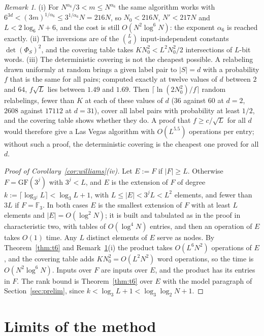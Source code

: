 \documentclass[11pt]{article}
\theoremstyle{definition}
\theoremstyle{remark}
\newtheorem{remark}[theorem]{Remark}
\newcommand{\F}{\mathbb{F}}
\newcommand{\GF}{\mathrm{GF}}
\newcommand{\Nz}{N_0}
\begin{document}
\begin{remark}\label{rem:constants6}
(i) For $N^{\alpha_6}/3<m\le N^{\alpha_6}$ the same algorithm works with $6^{3d}<(3m)^{1/\alpha_6}\le3^{1/\alpha_6}N=216N$, so $\Nz<216N$, $N'<217N$ and $L<2\log_6N+6$, and the cost is still $O(N^2\log^6N)$: the exponent $\alpha_6$ is reached exactly. (ii) The inversions are of the $\binom Ld$ input-independent constants $\det(\Phi_S)^2$, and the covering table takes $K\Nz^2<L^2\Nz^2/2$ intersections of $L$-bit words. (iii) The deterministic covering is not the cheapest possible. A relabeling drawn uniformly at random brings a given label pair to $|S|=d$ with a probability $f$ that is the same for all pairs; computed exactly at twelve values of $d$ between $2$ and $64$, $f\sqrt L$ lies between $1.49$ and $1.69$. Then $\lceil\ln(2\Nz^2)/f\rceil$ random relabelings, fewer than $K$ at each of these values of $d$ ($36$ against $60$ at $d=2$, $2608$ against $17112$ at $d=31$), cover all label pairs with probability at least $1/2$, and the covering table shows whether they do. A proof that $f\ge c/\sqrt L$ for all $d$ would therefore give a Las Vegas algorithm with $O(L^{5.5})$ operations per entry; without such a proof, the deterministic covering is the cheapest one proved for all $d$.
\end{remark}

\begin{proof}[Proof of Corollary~\ref{cor:williams}(iv)]
Let $E:=F$ if $|F|\ge L$. Otherwise $F=\GF(3^j)$ with $3^j<L$, and $E$ is the extension of $F$ of degree $k:=\lceil\log_{3^j}L\rceil<\log_3L+1$, with $L\le|E|<3^jL<L^2$ elements, and fewer than $3L$ if $F=\F_3$. In both cases $E$ is the smallest extension of $F$ with at least $L$ elements and $|E|=O(\log^2N)$; it is built and tabulated as in the proof in characteristic two, with tables of $O(\log^4N)$ entries, and then an operation of $E$ takes $O(1)$ time. Any $L$ distinct elements of $E$ serve as nodes. By Theorem~\ref{thm:t6} and Remark~\ref{rem:constants6}(i) the product takes $O(L^6N^2)$ operations of $E$, and the covering table adds $K\Nz^2=O(L^2N^2)$ word operations, so the time is $O(N^2\log^6N)$. Inputs over $F$ are inputs over $E$, and the product has its entries in $F$. The rank bound is Theorem~\ref{thm:t6} over $E$ with the model paragraph of Section~\ref{sec:prelim}, since $k<\log_3L+1<\log_3\log_2N+1$.
\end{proof}

\section{Limits of the method}\label{sec:limits}
\end{document}

